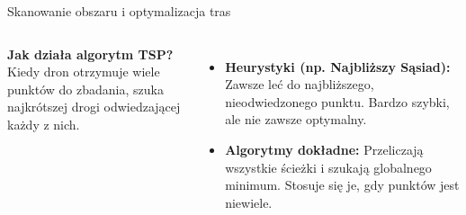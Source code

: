\begin{frame}{Skanowanie obszaru i optymalizacja tras}
\begin{columns}
        \small
        \textbf{Jak działa algorytm TSP?} \\
        Kiedy dron otrzymuje wiele punktów do zbadania, szuka najkrótszej drogi odwiedzającej każdy z nich.
        \begin{itemize}
            \item \textbf{Heurystyki (np. Najbliższy Sąsiad):} Zawsze leć do najbliższego, nieodwiedzonego punktu. Bardzo szybki, ale nie zawsze optymalny.
            \item \textbf{Algorytmy dokładne:} Przeliczają wszystkie ścieżki i szukają globalnego minimum. Stosuje się je, gdy punktów jest niewiele.
        \end{itemize}
    \end{columns}
\end{frame}

